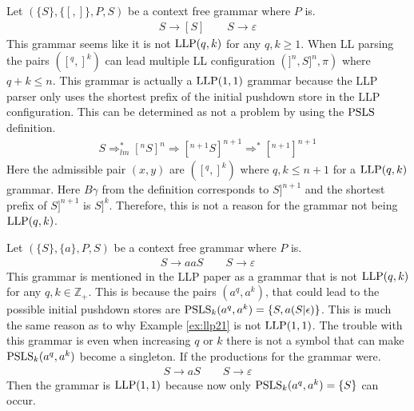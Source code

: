 \begin{example}
    Let $(\{S\}, \{[, ]\}, P, S)$ be a context free grammar where $P$ is.
    \begin{gather*}
        S \to [S] \qquad S \to \varepsilon
    \end{gather*}
    This grammar seems like it is not $\text{LLP}(q, k)$ for any $q, k \geq 1$. When LL parsing the pairs $([^q, ]^k)$ can lead multiple LL configuration $(]^n, S]^n, \pi)$ where $q + k \leq n$. This grammar is actually a $\text{LLP}(1,1)$ grammar because the LLP parser only uses the shortest prefix of the initial pushdown store in the LLP configuration. This can be determined as not a problem by using the $\text{PSLS}$ definition.
    \begin{align*}
        S \Rightarrow_{lm}^* [^nS]^n \Rightarrow [^{n + 1}S]^{n + 1} \Rightarrow^* [^{n + 1}]^{n + 1}
    \end{align*}
    Here the admissible pair $(x, y)$ are $([^q, ]^k)$ where $q, k \leq n + 1$ for a $\text{LLP}(q, k)$ grammar. Here $B\gamma$ from the definition corresponds to $S]^{n+1}$ and the shortest prefix of $S]^{n+1}$ is $S]^k$. Therefore, this is not a reason for the grammar not being $\text{LLP}(q,k)$.
\end{example}

\begin{example}
    Let $(\{S\}, \{a\}, P, S)$ be a context free grammar where $P$ is.
    \begin{gather*}
        S \to aaS \qquad S \to \varepsilon
    \end{gather*}
    This grammar is mentioned in the LLP paper \cite[16]{Vagner2007} as a grammar that is not $\text{LLP}(q,k)$ for any $q, k \in \mathbb{Z}_+$. This is because the pairs $(a^q, a^k)$, that could lead to the possible initial pushdown stores are $\text{PSLS}_k(a^q, a^k) = \{S, a(S|\epsilon)\}$. This is much the same reason as to why Example \ref{ex:llp21} is not $\text{LLP}(1, 1)$. The trouble with this grammar is even when increasing $q$ or $k$ there is not a symbol that can make $\text{PSLS}_k(a^q, a^k)$ become a singleton. If the productions for the grammar were.
    \begin{gather*}
        S \to aS \qquad S \to \varepsilon
    \end{gather*}
    Then the grammar is $\text{LLP}(1, 1)$ because now only $\text{PSLS}_k(a^q, a^k) = \{S\}$ can occur.
\end{example}